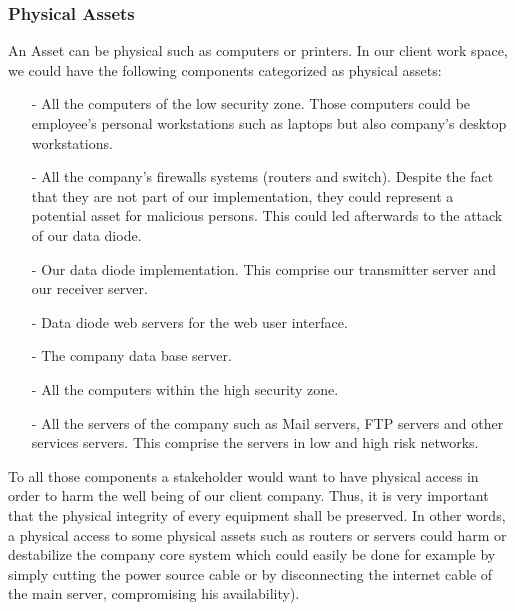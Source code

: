 \documentclass[a4paper,10pt]{article}
\begin{document}
\subsubsection{Physical Assets}
An Asset can be physical such as computers or printers. In our client work space, we could have the following components categorized as physical assets:
\begin{enumerate}
\item[-] All the computers of the low security zone. Those computers could be employee's personal workstations such as laptops but also company's desktop workstations.
\item[-] All the company's firewalls systems (routers and switch). Despite the fact that they are not part of our implementation, they could represent a potential asset for malicious persons. This could led afterwards to the attack of our data diode.
\item[-] Our data diode implementation. This comprise our transmitter server and our receiver server.
\item[-] Data diode web servers for the web user interface.
\item[-] The company data base server.
\item[-] All the computers within the high security zone.
\item[-] All the servers of the company such as Mail servers, FTP servers and other services servers. This comprise the servers in low and high risk networks.

\end{enumerate}
To all those components a stakeholder would want to have physical access in order to harm the well being of our client company. Thus, it is very important that the physical integrity of every equipment shall be preserved. In other words, a physical access to some physical assets such as routers or servers could harm or destabilize the company core system which could easily be done for example by simply cutting the power source cable or by disconnecting the internet cable of the main server, compromising his availability).
\end{document}
